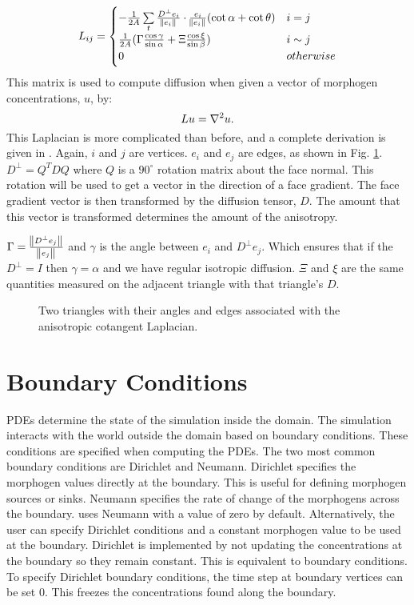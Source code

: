\begin{equation} 
   L_{ij} =
   \begin{cases} 
      -\frac{1}{2A}\sum\limits_{t} \frac{D^\perp e_i}{\norm{e_i}} \cdot \frac{e_i}{\norm{e_i}}(\cot{\alpha}+\cot{\theta})  & i = j \\
      \frac{1}{2A}(\Gamma \frac{\cos{\gamma}}{\sin{\alpha}} + \Xi\frac{\cos{\xi}}{\sin{\beta}})   & i \sim j \\
      0 & otherwise
   \end{cases}
\end{equation}
This matrix is used to compute diffusion when given a vector of morphogen concentrations, $u$, by:
\begin{equation}
	Lu = \nabla^2 u.
\end{equation}
This Laplacian is more complicated than before, and a complete derivation is given in \citep{mathieu2014}. Again, $i$ and $j$ are vertices. $e_i$ and $e_j$ are edges, as shown in Fig. \ref{fig:meshLaplacian}. $D^\perp = Q^T D Q$ where $Q$ is a $90^\circ$ rotation matrix about the face normal. This rotation will be used to get a vector in the direction of a face gradient. The face gradient vector is then transformed by the diffusion tensor, $D$. The amount that this vector is transformed determines the amount of the anisotropy. 

$\Gamma = \frac{\norm{D^\perp e_j}}{\norm{e_j}}$ and $\gamma$ is the angle between $e_i$ and $D^\perp e_j$. Which ensures that if the $D^{\perp} = I$ then $\gamma = \alpha$ and we have regular isotropic diffusion. $\Xi$ and $\xi$ are the same quantities measured on the adjacent triangle with that triangle's $D$. 

\begin{figure}[H]
	\centering
	\caption{Two triangles with their angles and edges associated with the anisotropic cotangent Laplacian.}
	\label{fig:meshLaplacian}
\end{figure}

\section{Boundary Conditions}
PDEs determine the state of the simulation inside the domain. The simulation interacts with the world outside the domain based on boundary conditions. These conditions are specified when computing the PDEs. The two most common boundary conditions are Dirichlet and Neumann. Dirichlet specifies the morphogen values directly at the boundary. This is useful for defining morphogen sources or sinks. Neumann specifies the rate of change of the morphogens across the boundary. \ProgramName{} uses Neumann with a value of zero by default. Alternatively, the user can specify Dirichlet conditions and a constant morphogen value to be used at the boundary. Dirichlet is implemented by not updating the concentrations at the boundary so they remain constant. This is equivalent to  boundary conditions. To specify Dirichlet boundary conditions, the time step at boundary vertices can be set 0. This freezes the concentrations found along the boundary.

